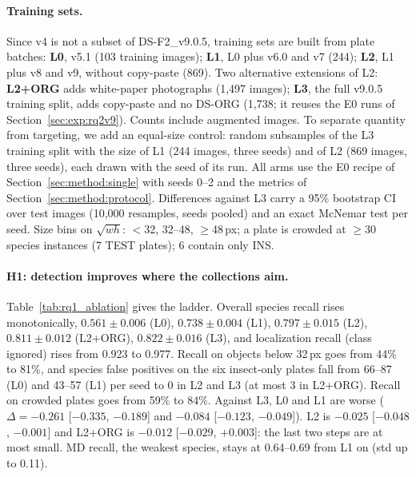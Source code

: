 \paragraph{Training sets.}
Since v4 is not a subset of DS-F2\_v9.0.5, training sets are built from plate batches: \textbf{L0}, v5.1 (103 training images); \textbf{L1}, L0 plus v6.0 and v7 (244); \textbf{L2}, L1 plus v8 and v9, without copy-paste (869). Two alternative extensions of L2: \textbf{L2+ORG} adds white-paper photographs (1{,}497 images); \textbf{L3}, the full v9.0.5 training split, adds copy-paste and no DS-ORG (1{,}738; it reuses the E0 runs of Section~\ref{sec:exp:rq2v9}). Counts include augmented images. To separate quantity from targeting, we add an equal-size control: random subsamples of the L3 training split with the size of L1 (244 images, three seeds) and of L2 (869 images, three seeds), each drawn with the seed of its run. All arms use the E0 recipe of Section~\ref{sec:method:single} with seeds 0--2 and the metrics of Section~\ref{sec:method:protocol}. Differences against L3 carry a 95\% bootstrap CI over test images (10{,}000 resamples, seeds pooled) and an exact McNemar test per seed. Size bins on $\sqrt{wh}$: $<$32, 32--48, $\ge$48\,px; a plate is crowded at $\ge$30 species instances (7 TEST plates); 6 contain only INS.

\paragraph{H1: detection improves where the collections aim.}
Table~\ref{tab:rq1_ablation} gives the ladder. Overall species recall rises monotonically, $0.561\pm0.006$ (L0), $0.738\pm0.004$ (L1), $0.797\pm0.015$ (L2), $0.811\pm0.012$ (L2+ORG), $0.822\pm0.016$ (L3), and localization recall (class ignored) rises from 0.923 to 0.977. Recall on objects below 32\,px goes from 44\% to 81\%, and species false positives on the six insect-only plates fall from 66--87 (L0) and 43--57 (L1) per seed to 0 in L2 and L3 (at most 3 in L2+ORG). Recall on crowded plates goes from 59\% to 84\%. Against L3, L0 and L1 are worse ($\Delta=-0.261$ [$-0.335$, $-0.189$] and $-0.084$ [$-0.123$, $-0.049$]). L2 is $-0.025$ [$-0.048$, $-0.001$] and L2+ORG is $-0.012$ [$-0.029$, $+0.003$]: the last two steps are at most small. MD recall, the weakest species, stays at 0.64--0.69 from L1 on (std up to 0.11).

